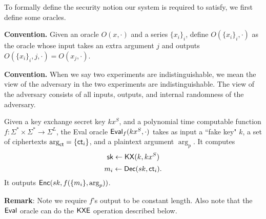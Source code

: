 
To formally define the security notion our system is required to satisfy, we first define some oracles.

\textbf{Convention.} Given an oracle $O(x, \cdot)$ and a series $\{x_i\}_i$, define $O(\{x_i\}_i, \cdot)$ as the oracle whose input takes an extra argument $j$ and outputs $O(\{x_i\}_i, j, \cdot) = O(x_j, \cdot)$.

\textbf{Convention.} When we say two experiments are indistinguishable, we mean the view of the adversary in the two experiments are indistinguishable. The view of the adversary consists of all inputs, outputs, and internal randomness of the adversary.
\begin{definition}
\label{defn:ack-oracle}
Given a key exchange secret key $kx^S$, and a polynomial time computable function $f: \Sigma^* \times \Sigma^* \to \Sigma^L$, the Eval oracle $\mathsf{Eval}_{f}(kx^S, \cdot)$ takes as input a ``fake key" $k$, a set of ciphertexts $\arg_{\mathsf{ct}} = \{\mathsf{ct}_i\}$, and a plaintext argument $\arg_{p}$. It computes 
$${\mathsf{sk}} \leftarrow \mathsf{KX}(k, kx^S)$$
$$m_i \leftarrow \mathsf{Dec}(sk, \mathsf{ct}_i).$$ 
It outputs $\mathsf{Enc}(sk, f(\{m_i\}, \arg_p))$.
\end{definition}
\textbf{Remark}: Note we require $f$'s output to be constant length. Also note that the $\mathsf{Eval}$ oracle can do the $\mathsf{KXE}$ operation described below.
